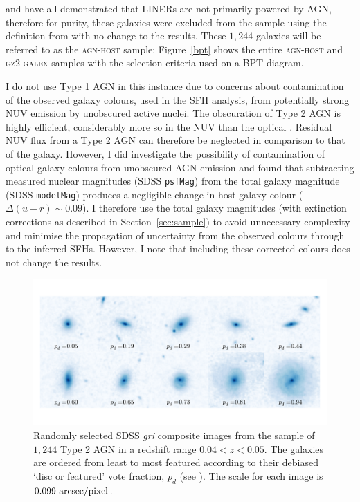\cite{Sarzi10, yan12} and \cite{Singh13} have all demonstrated that LINERs are not primarily powered by AGN, therefore for purity, these galaxies were excluded from the sample using the definition from \cite[][$55$ galaxies total]{kewley06} with no change to the results. These $1,244$ galaxies will be referred to as the \textsc{agn-host} sample; Figure~\ref{bpt} shows the entire \textsc{agn-host} and \textsc{gz2-galex} samples with the selection criteria used on a BPT diagram.

I do not use Type 1 AGN in this instance due to concerns about contamination of the observed galaxy colours, used in the SFH analysis, from potentially strong NUV emission by unobscured active nuclei. The obscuration of Type 2 AGN is highly efficient, considerably more so in the NUV than the optical \citep{Simmons11}. Residual NUV flux from a Type 2 AGN can therefore be neglected in comparison to that of the galaxy. However, I did investigate the possibility of contamination of optical galaxy colours from unobscured AGN emission and found that subtracting measured nuclear magnitudes (SDSS {\tt psfMag}) from the total galaxy magnitude (SDSS {\tt modelMag}) produces a negligible change in host galaxy colour ($\Delta(u-r) \sim 0.09$). I therefore use the total galaxy magnitudes (with extinction corrections as described in Section~\ref{sec:sample}) to avoid unnecessary complexity and minimise the propagation of uncertainty from the observed colours through to the inferred SFHs. However, I note that including these corrected colours does not change the results.

\begin{figure}
\includegraphics[width=\textwidth]{agn/fig1.pdf}
\caption[SDSS images of galaxies in the \textsc{agn-host} sample]{Randomly selected SDSS \emph{gri} composite images from the sample of $1,244$ Type 2 AGN in a redshift range $0.04 < z < 0.05$.  The galaxies are ordered from least to most featured according to their debiased `disc or featured' vote fraction, $p_d$ (see \citealt{GZ2}). The scale for each image is $0.099~\rm{arcsec/pixel}$.}
\label{mosaic}
\end{figure}

